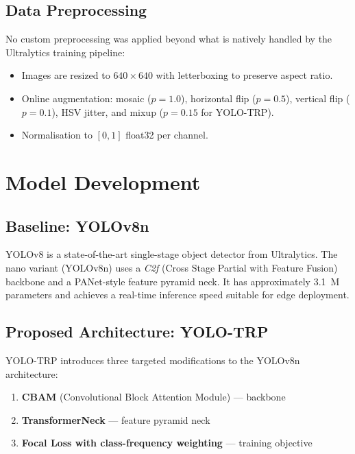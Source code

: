 \documentclass[12pt, a4paper]{article}
\begin{document}
\subsection{Data Preprocessing}

No custom preprocessing was applied beyond what is natively handled by the Ultralytics training pipeline:
\begin{itemize}
    \item Images are resized to $640 \times 640$ with letterboxing to preserve aspect ratio.
    \item Online augmentation: mosaic ($p=1.0$), horizontal flip ($p=0.5$), vertical flip ($p=0.1$), HSV jitter, and mixup ($p=0.15$ for YOLO-TRP).
    \item Normalisation to $[0, 1]$ float32 per channel.
\end{itemize}

\section{Model Development}
\label{sec:model}

\subsection{Baseline: YOLOv8n}

YOLOv8 \cite{ultralytics2023} is a state-of-the-art single-stage object detector from Ultralytics. The nano variant (YOLOv8n) uses a \emph{C2f} (Cross Stage Partial with Feature Fusion) backbone and a PANet-style feature pyramid neck. It has approximately 3.1~M parameters and achieves a real-time inference speed suitable for edge deployment.

\subsection{Proposed Architecture: YOLO-TRP}

YOLO-TRP introduces three targeted modifications to the YOLOv8n architecture:

\begin{enumerate}
    \item \textbf{CBAM} (Convolutional Block Attention Module) — backbone
    \item \textbf{TransformerNeck} — feature pyramid neck
    \item \textbf{Focal Loss with class-frequency weighting} — training objective
\end{enumerate}
\end{document}
